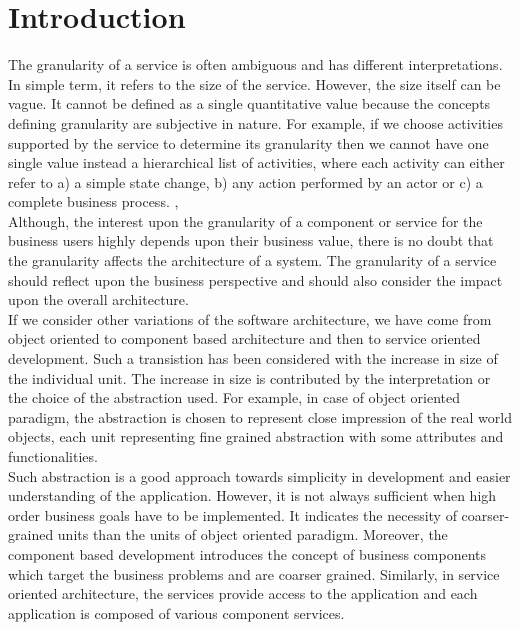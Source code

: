 \section{Introduction}\label{section:granularity/introduction}
The granularity of a service is often ambiguous and has different interpretations. In simple term, it refers to the size of the service. However, the size itself can be vague. It cannot be defined as a single quantitative value because the concepts defining granularity are subjective in nature. For example, if we choose activities supported by the service to determine its granularity then we cannot have one single value instead a hierarchical list of activities, where each activity can either refer to a) a simple state change, b) any action performed by an actor or c) a complete business process. \cite{Linthicum:2015aa}, \cite{Raf-Haesen:2015aa}
\\
Although, the interest upon the granularity of a component or service for the business users highly depends upon their business value, there is no doubt that the granularity affects the architecture of a system. The granularity of a service should reflect upon the business perspective and should also consider the impact upon the overall architecture.
\\
If we consider other variations of the software architecture, we have come from object oriented to component based architecture and then to service oriented development. Such a transistion has been considered with the increase in size of the individual unit. The increase in size is contributed by the interpretation or the choice of the abstraction used. For example, in case of object oriented paradigm, the abstraction is chosen to represent close impression of the real world objects, each unit representing fine grained abstraction with some attributes and functionalities. 
\\
Such abstraction is a good approach towards simplicity in development and easier understanding of the application. However, it is not always sufficient when high order business goals have to be implemented. It indicates the necessity of coarser-grained units than the units of object oriented paradigm. Moreover, the component based development introduces the concept of business components which target the business problems and are coarser grained. Similarly, in service oriented architecture, the services provide access to the application and each application is composed of various component services. \cite{Linthicum:2015aa}

